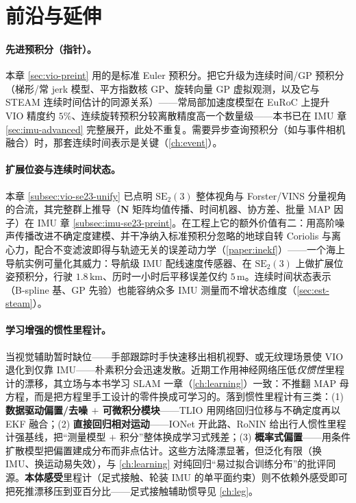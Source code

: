 \section{前沿与延伸}
\label{sec:vio-frontier}

\paragraph{先进预积分（指针）。}
本章 \cref{sec:vio-preint} 用的是标准 Euler 预积分。把它升级为连续时间/GP 预积分（梯形/常 jerk 模型、平方指数核 GP、旋转向量 GP 虚拟观测，以及它与 STEAM 连续时间估计的同源关系）——常局部加速度模型在 EuRoC 上提升 VIO 精度约 $5\%$、连续旋转预积分较离散精度高一个数量级——本书已在 IMU 章 \cref{sec:imu-advanced} 完整展开，此处不重复。需要异步查询预积分（如与事件相机融合）时，那套连续时间表示是关键（\cref{ch:event}）。

\paragraph{扩展位姿与连续时间状态。}
本章 \cref{subsec:vio-se23-unify} 已点明 $\mathrm{SE}_2(3)$ 整体视角与 Forster/VINS 分量视角的合流，其完整群上推导（$\mathbf N$ 矩阵均值传播、时间机器、协方差、批量 MAP 因子）在 IMU 章 \cref{subsec:imu-se23-preint}。在工程上它的额外价值有二：用高阶噪声传播改进不确定度建模、并干净纳入标准预积分忽略的地球自转 Coriolis 与离心力\cite{brossard2021associating}，配合不变滤波即得与轨迹无关的误差动力学（\cref{paper:inekf}）——一个海上导航实例可量化其威力：导航级 IMU 配线速度传感器、在 $\mathrm{SE}_2(3)$ 上做扩展位姿预积分，行驶 $1.8\,\mathrm{km}$、历时一小时后平移误差仅约 $5\,\mathrm m$\cite{carlone2026handbook}。连续时间状态表示（B-spline 基、GP 先验）也能容纳众多 IMU 测量而不增状态维度（\cref{sec:est-steam}）。

\paragraph{学习增强的惯性里程计。}
当视觉辅助暂时缺位——手部跟踪时手快速移出相机视野、或无纹理场景使 VIO 退化到仅靠 IMU——朴素积分会迅速发散。近期工作用神经网络压低\emph{仅惯性}里程计的漂移，其立场与本书学习 SLAM 一章（\cref{ch:learning}）一致：不推翻 MAP 母方程，而是把方程里手工设计的零件换成可学习的。落到惯性里程计有三类：(1) \textbf{数据驱动偏置/去噪 $+$ 可微积分模块}——TLIO\cite{liu2020tlio} 用网络回归位移与不确定度再以 EKF 融合；(2) \textbf{直接回归相对运动}——IONet\cite{chen2018ionet} 开此路、RoNIN\cite{herath2020ronin} 给出行人惯性里程计强基线，把“测量模型 $+$ 积分”整体换成学习式残差；(3) \textbf{概率式偏置}——用条件扩散模型把偏置建成分布而非点估计\cite{carlone2026handbook}。这些方法降漂显著，但泛化有限（换 IMU、换运动易失效），与 \cref{ch:learning} 对纯回归“易过拟合训练分布”的批评同源。\textbf{本体感受}里程计（足式接触、轮装 IMU 的单平面约束）则不依赖外感受即可把死推漂移压到亚百分比——足式接触辅助惯导见 \cref{ch:leg}。


